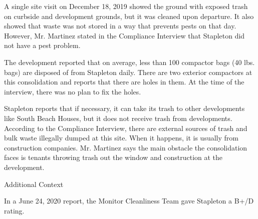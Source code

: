  

A single site visit on December 18, 2019 showed the ground with exposed trash on curbside and development grounds, but it was cleaned upon departure. It also showed that waste was not stored in a way that prevents pests on that day. However, Mr. Martinez stated in the Compliance Interview that Stapleton did not have a pest problem. 



The development reported that on average, less than 100  compactor bags (40 lbs. bags)  are disposed of from Stapleton daily. There are two exterior compactors at this consolidation and reports that there are holes in them. At the time of the interview, there was no plan to fix the holes. 



Stapleton reports that if necessary, it can take its trash to other developments like South Beach Houses, but it does not receive trash from developments. According to the Compliance Interview, there are external sources of trash and bulk waste illegally dumped at this site. When it happens, it is usually from construction companies. Mr. Martinez says the main obstacle the consolidation faces is tenants throwing trash out the window and construction at the development.  



Additional Context



In a June 24, 2020 report, the Monitor Cleanliness Team gave Stapleton a B+/D rating.